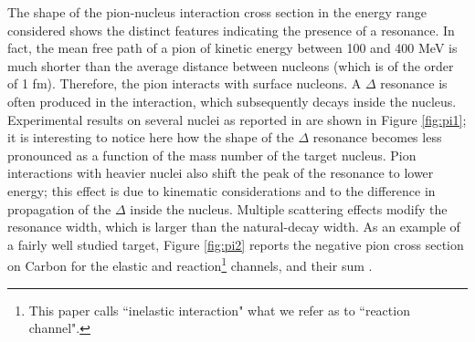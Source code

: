 The shape of the pion-nucleus interaction cross section in the energy range considered shows the distinct features indicating the presence of a resonance. In fact, the mean free path of a pion of kinetic energy between 100 and 400 MeV is much shorter than the average distance between nucleons (which is of the order of 1 fm). Therefore, the pion interacts with surface nucleons. A $\Delta$ resonance is often produced in the interaction, which subsequently decays inside the nucleus.
Experimental results on several nuclei as reported in \cite{PhysRevC.14.635} are shown in Figure \ref{fig:pi1}; it is interesting to notice here how the shape of the $\Delta$ resonance becomes less pronounced as a function of the mass number of the target nucleus. Pion interactions with heavier nuclei also shift the peak of the resonance to lower energy; this effect is due to kinematic considerations and to the difference in propagation of the $\Delta$ inside the nucleus. Multiple scattering effects modify the resonance width, which is larger than the natural-decay width.
As an example of a fairly well studied target, Figure \ref{fig:pi2} reports the negative pion cross section on Carbon for the elastic and reaction\footnote{ This paper calls  ``inelastic interaction" what we refer as to ``reaction channel".} channels, and their sum \cite{BINON1970168}.


